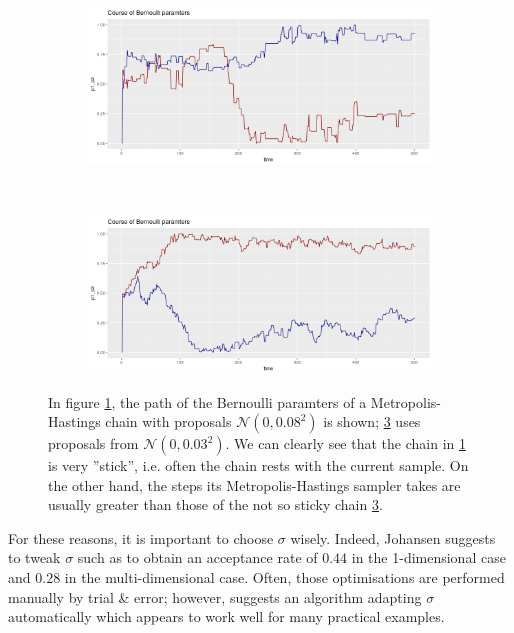 \begin{figure}
	\begin{subfigure}[b]{0.9\textwidth}
		\includegraphics[width=\linewidth]{./img/sticky_chain.png}
		\caption{}
		\label{fig:sticky_chain}
	\end{subfigure}\\
	\begin{subfigure}[b]{0.9\textwidth}
		\includegraphics[width=\linewidth]{./img/unsticky_chain.png}
		\caption{}
		\label{fig:unsticky_chain}
	\end{subfigure}
	\caption{In figure \ref{fig:sticky_chain}, the path of the Bernoulli paramters of a Metropolis-Hastings chain with proposals $\mathcal{N}(0, 0.08^2)$ is shown; \ref{fig:unsticky_chain} uses proposals from $\mathcal{N}(0, 0.03^2)$. We can clearly see that the chain in \ref{fig:sticky_chain} is very ''stick'', i.e. often the chain rests with the current sample. On the other hand, the steps its Metropolis-Hastings sampler takes are usually greater than those of the not so sticky chain \ref{fig:unsticky_chain}. } 
\end{figure}


For these reasons, it is important to choose $\sigma$ wisely. Indeed, Johansen \cite{mcnotes} suggests to tweak $\sigma$ such as to obtain an acceptance rate of $0.44$ in the 1-dimensional case and $0.28$ in the multi-dimensional case. Often, those optimisations are performed manually by trial \& error; however, \cite{christen2010} suggests an algorithm adapting $\sigma$ automatically which appears to work well for many practical examples. 


